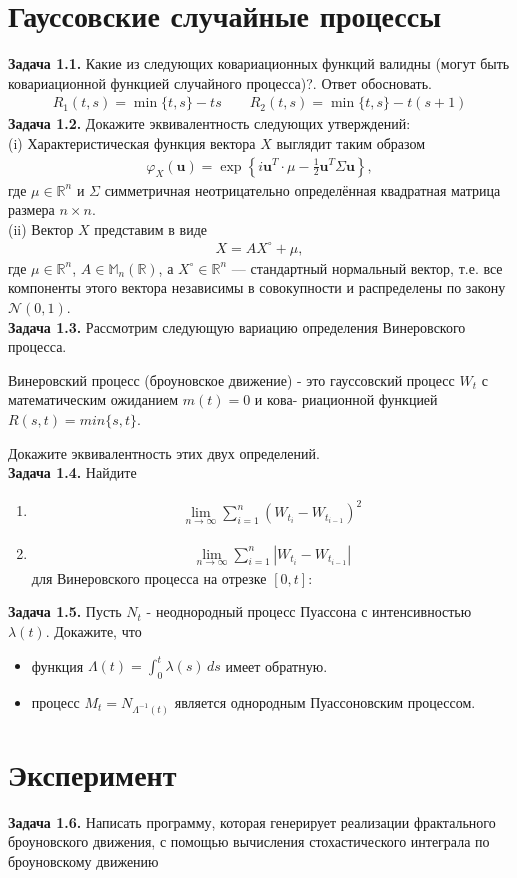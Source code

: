 \documentclass[12pt]{article}
\renewcommand{\=}[1]{\stackrel{#1}{=}} %
\begin{document}
\section{Гауссовские случайные процессы}
\textbf{Задача 1.1.} Какие из следующих ковариационных функций валидны (могут быть ковариационной функцией случайного процесса)?. Ответ обосновать.
\begin{align}
    R_1(t, s) = \min\{t, s\} - ts \qquad R_2(t, s) = \min\{t, s\} - t(s + 1)
\end{align}
\textbf{Задача 1.2.} Докажите эквивалентность следующих утверждений: \\
(i) Характеристическая функция вектора $X$ выглядит таким образом 
\begin{align}
    \varphi_X(\mathbf{u}) = \exp\left\{i \mathbf{u}^T \cdot \mu - \frac 1 2 \mathbf{u}^T \Sigma \mathbf{u} \right\},
\end{align}
где $\mu \in \mathbb{R}^n$ и $\Sigma$ симметричная неотрицательно определённая квадратная матрица размера $n \times n$. \\
(ii) Вектор $X$ представим в виде 
\begin{align}
    X = A X^{\circ} + \mu,
\end{align}
где $\mu \in \mathbb{R}^n$, $A \in \mathbb{M}_n(\mathbb{R})$, а $X^{\circ} \in \mathbb{R}^n$ --- стандартный нормальный вектор, т.е. все компоненты этого вектора независимы в совокупности и распределены по закону $\mathcal{N}(0, 1)$.   
\\
\textbf{Задача 1.3.} Рассмотрим следующую вариацию определения Винеровского процесса. 
\par Винеровский процесс (броуновское движение) - это гауссовский процесс $W_t$ с математическим ожиданием $m(t) = 0$ и кова- риационной функцией $R(s, t) = min\{s, t\}$. 
\par Докажите эквивалентность этих двух определений. 
\\
\textbf{Задача 1.4.} Найдите 
\begin{enumerate}
    \item 
    \begin{align}
        \lim_{n \to \infty} \sum_{i=1}^n \left(W_{t_i} - W_{t_{i-1}}\right)^2 
    \end{align}
    \item
    \begin{align}
         \lim_{n \to \infty} \sum_{i=1}^n \left|W_{t_i} - W_{t_{i-1}}\right|
    \end{align}
    для Винеровского процесса на отрезке $[0, t]$:
\end{enumerate}
\textbf{Задача 1.5.} Пусть $N_t$ - неоднородный процесс Пуассона с интенсивностью $\lambda(t)$. Докажите, что 
\begin{itemize}
    \item функция $\Lambda(t) = \int_{0}^t \lambda(s) \, ds$ имеет обратную. 
    \item процесс $M_t = N_{\Lambda^{-1}(t)}$ является однородным Пуассоновским процессом. 
\end{itemize}
\section{Эксперимент}

\textbf{Задача 1.6.} Написать программу, которая генерирует реализации фрактального броуновского движения, с помощью вычисления стохастического интеграла по броуновскому движению
\\
\end{document}
